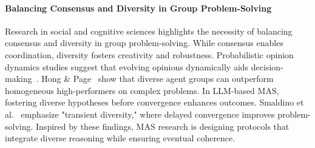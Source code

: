 \paragraph{Balancing Consensus and Diversity in Group Problem-Solving} Research in social and cognitive sciences highlights the necessity of balancing consensus and diversity in group problem-solving. While consensus enables coordination, diversity fosters creativity and robustness. Probabilistic opinion dynamics studies suggest that evolving opinions dynamically aids decision-making~\cite{liu2022probabilistic}. Hong \& Page~\cite{Hong2004diversity} show that diverse agent groups can outperform homogeneous high-performers on complex problems. In LLM-based MAS, fostering diverse hypotheses before convergence enhances outcomes. Smaldino et al.~\cite{Smaldino2024diversity} emphasize "transient diversity," where delayed convergence improves problem-solving. Inspired by these findings, MAS research is designing protocols that integrate diverse reasoning while ensuring eventual coherence.
